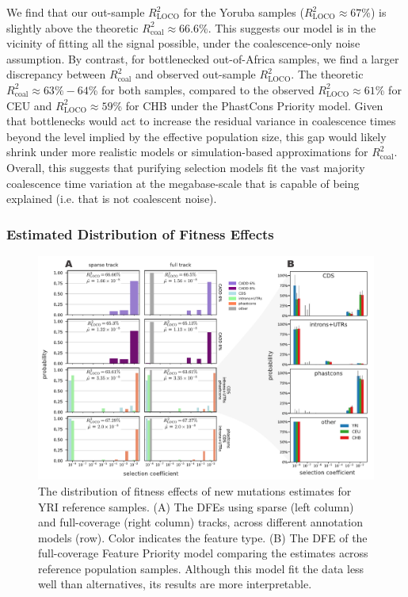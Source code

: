 \documentclass[11pt]{article}
\begin{document}
We find that our out-sample $R_\text{LOCO}^2$ for the Yoruba samples
($R_\text{LOCO}^2 \approx 67$\%) is slightly above the theoretic
$R_\text{coal}^2 \approx 66.6$\%. This suggests our model is in the vicinity of
fitting all the signal possible, under the coalescence-only noise assumption.
By contrast, for bottlenecked out-of-Africa samples, we find a larger
discrepancy between $R_\text{coal}^2$ and observed out-sample
$R_\text{LOCO}^2$. The theoretic $R_\text{coal}^2 \approx 63\%-64$\% for both
samples, compared to the observed $R_\text{LOCO}^2 \approx 61$\% for CEU
and $R_\text{LOCO}^2 \approx 59$\% for CHB under the PhastCons Priority model.
Given that bottlenecks would act to increase the residual variance in
coalescence times beyond the level implied by the effective population size,
this gap would likely shrink under more realistic models or simulation-based
approximations for $R_\text{coal}^2$. Overall, this suggests that purifying
selection models fit the vast majority coalescence time variation at the
megabase-scale that is capable of being explained (i.e. that is not coalescent
noise).

\subsubsection*{Estimated Distribution of Fitness Effects}

\begin{figure}[htbp] \centering
    \includegraphics[width=\textwidth]{figures/figure_4.pdf} 

    \caption{The distribution of fitness effects of new mutations estimates for
        YRI reference samples. (A) The DFEs using sparse (left column) and
        full-coverage (right column) tracks, across different annotation models
        (row). Color indicates the feature type. (B) The DFE of the
    full-coverage Feature Priority model comparing the estimates across
reference population samples. Although this model fit the data less well than alternatives, its
results are more interpretable.}

  \label{fig:figure-4}
\end{figure}
\end{document}
